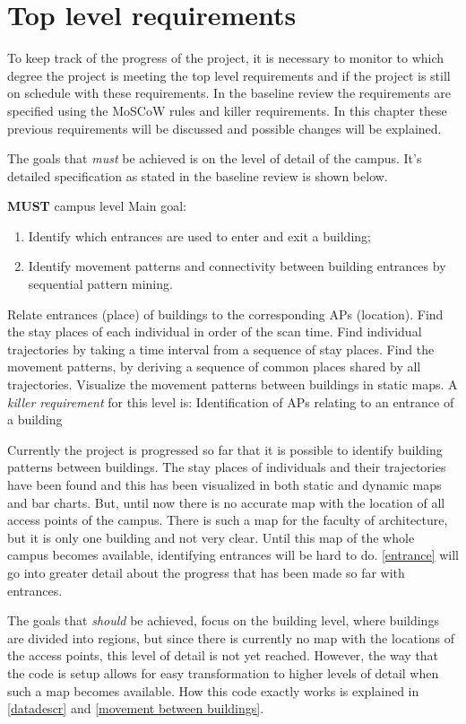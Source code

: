 \chapter{Top level requirements}
To keep track of the progress of the project, it is necessary to monitor to which degree the project is meeting the top level requirements and if the project is still on schedule with these requirements. In the baseline review the requirements are specified using the MoSCoW rules and killer requirements. In this chapter these previous requirements will be discussed and possible changes will be explained.

The goals that \textit{must} be achieved is on the level of detail of the campus. It’s detailed specification as stated in the baseline review is shown below. 

\textbf{MUST} campus level
Main goal: 
\begin{enumerate}
\item Identify which entrances are used to enter and exit a building;
\item Identify movement patterns and connectivity between building entrances by sequential pattern mining.
\end{enumerate}
Relate entrances (place) of buildings to the corresponding APs (location).
Find the stay places of each individual in order of the scan time.
Find individual trajectories by taking a time interval from a sequence of stay places.
Find the movement patterns, by deriving a sequence of common places shared by all trajectories.
Visualize the movement patterns between buildings in static maps.
A \textit{killer requirement} for this level is:
Identification of APs relating to an entrance of a building

Currently the project is progressed so far that it is possible to identify building patterns between buildings. The stay places of individuals and their trajectories have been found and this has been visualized in both static and dynamic maps and bar charts. But, until now there is no accurate map with the location of all access points of the campus. There is such a map for the faculty of architecture, but it is only one building and not very clear. Until this map of the whole campus becomes available, identifying entrances will be hard to do. \autoref{entrance} will go into greater detail about the progress that has been made so far with entrances. 

The goals that \textit {should} be achieved, focus on the building level, where buildings are divided into regions, but since there is currently no map with the locations of the access points, this level of detail is not yet reached. However, the way that the code is setup allows for easy transformation to higher levels of detail when such a map becomes available. How this code exactly works is explained in \autoref{datadescr} and \autoref{movement between buildings}. 
